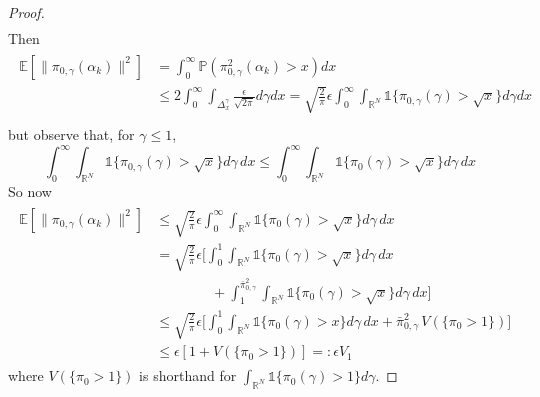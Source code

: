\documentclass[journal,onecolumn]{IEEEtran}
\newcommand{\alk}{\alpha_k}
\newcommand{\step}{\epsilon}
\newcommand{\reals}{\mathbb{R}}
\newcommand{\CE}{\mathbb{E}}
\newcommand{\PR}{\mathbb{P}}
\newcommand{\dimn}{N}
\newcommand{\idistr}{\ids_0}
\newcommand{\ids}{\pi}
\newcommand{\idw}{\gamma}
\newcommand{\isp}{0,\idw}
\newcommand{\idistmaxw}{\bar{\ids}_{\isp}}
\newcommand{\levxw}{\Delta_{x}^{\idw}}
\newcommand{\idistrw}{\ids_{\isp}}
\newcommand{\ibd}{V_1}
\begin{document}
{\begin{proof}
\begin{align*}
\end{align*}
Then  
\begin{align*}
    \begin{split}
    \CE\left[\|\idistrw(\alk)\|^2\right] &= \int_{0}^{\infty}\PR(\idistrw^2(\alk) > x)dx\\
    &\leq 2\int_0^{\infty}\int_{\levxw}\frac{\step}{\sqrt{2\pi}}d\gamma dx  =\sqrt{\frac{2}{\pi}}\step\int_{0}^{\infty}\int_{\reals^{\dimn}}\mathds{1}\{\idistrw(\gamma)>\sqrt{x}\}d\gamma dx \\
    \end{split}
\end{align*}
but observe that, for $\idw \leq 1$,  \[\int_{0}^{\infty}\int_{\reals^{\dimn}}\mathds{1}\{\idistrw(\gamma)>\sqrt{x}\}d\gamma\, dx \leq \int_{0}^{\infty}\int_{\reals^{\dimn}}\mathds{1}\{\idistr(\gamma)>\sqrt{x}\}d\gamma \,dx\]
So now
\begin{align*}
    \begin{split}
         \CE\left[\|\idistrw(\alk)\|^2\right] 
         &\leq \sqrt{\frac{2}{\pi}}\step\int_{0}^{\infty}\int_{\reals^{\dimn}}\mathds{1}\{\idistr(\gamma)>\sqrt{x}\}d\gamma \,dx \\
         &= \sqrt{\frac{2}{\pi}}\step\biggl[\int_{0}^{1}\int_{\reals^{\dimn}}\mathds{1}\{\idistr(\gamma)>\sqrt{x}\}d\gamma \,dx \\&\quad \quad \quad \quad + \int_{1}^{\idistmaxw^2}\int_{\reals^{\dimn}}\mathds{1}\{\idistr(\gamma)>\sqrt{x}\}d\gamma \,dx\biggr] \\&\leq \sqrt{\frac{2}{\pi}}\step\biggl[\int_{0}^{1}\int_{\reals^{\dimn}}\mathds{1}\{\idistr(\gamma)> x\}d\gamma \,dx + \idistmaxw^2\,V(\{\idistr > 1\})\biggr] \\
         &\leq \step\left[1 + V(\{\idistr>1\})\right] =: \step \ibd
    \end{split}
\end{align*}
where $V(\{\idistr>1\})$ is shorthand for $\int_{\reals^{\dimn}}\mathds{1}\{\idistr(\gamma)>1\}d\gamma$.


\end{proof}}
\end{document}
